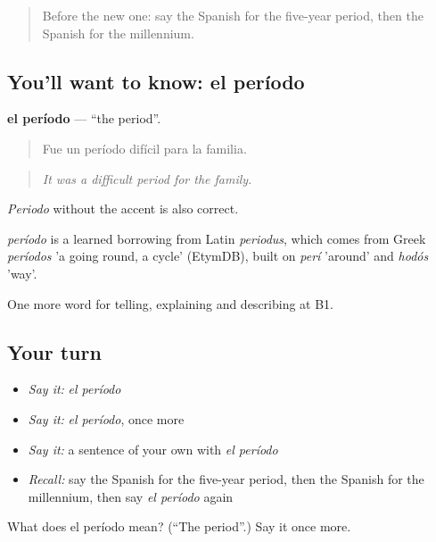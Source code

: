 \begin{quote}
Before the new one: say the Spanish for the five-year period, then the Spanish for the millennium.
\end{quote}

\subsection*{You'll want to know: el período}
\textbf{el período} — \textquotedblleft{}the period\textquotedblright{}.

\begin{quote}
Fue un período difícil para la familia.
\end{quote}

\begin{quote}
\emph{It was a difficult period for the family.}
\end{quote}

\emph{Periodo} without the accent is also correct.

\begin{cousinweb}
\emph{período} is a learned borrowing from Latin \emph{periodus}, which comes from Greek \emph{períodos} 'a going round, a cycle' (EtymDB), built on \emph{perí} 'around' and \emph{hodós} 'way'.
\end{cousinweb}

\begin{grammarlens}[title={What you've built}]
One more word for telling, explaining and describing at B1.
\end{grammarlens}

\subsection*{Your turn}
\begin{itemize}
\raggedright
  \item \emph{Say it:} \emph{el período}
  \item \emph{Say it:} \emph{el período}, once more
  \item \emph{Say it:} a sentence of your own with \emph{el período}
  \item \emph{Recall:} say the Spanish for the five-year period, then the Spanish for the millennium, then say \emph{el período} again
\end{itemize}

\begin{tcolorbox}[breakable,colback=teal!4,colframe=teal!35!black,title={Before you move on}]
What does el período mean? (\textquotedblleft{}The period\textquotedblright{}.) Say it once more.
\end{tcolorbox}
